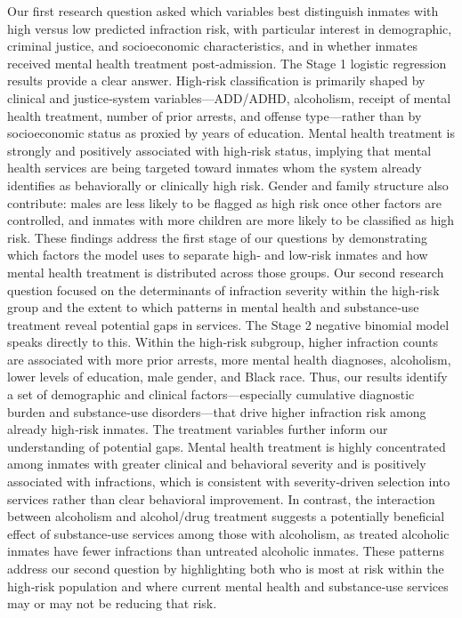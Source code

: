 \documentclass[
]{article}
\begin{document}
Our first research question asked which variables best distinguish
inmates with high versus low predicted infraction risk, with particular
interest in demographic, criminal justice, and socioeconomic
characteristics, and in whether inmates received mental health treatment
post‑admission. The Stage 1 logistic regression results provide a clear
answer. High‑risk classification is primarily shaped by clinical and
justice‑system variables---ADD/ADHD, alcoholism, receipt of mental
health treatment, number of prior arrests, and offense type---rather
than by socioeconomic status as proxied by years of education. Mental
health treatment is strongly and positively associated with high‑risk
status, implying that mental health services are being targeted toward
inmates whom the system already identifies as behaviorally or clinically
high risk. Gender and family structure also contribute: males are less
likely to be flagged as high risk once other factors are controlled, and
inmates with more children are more likely to be classified as high
risk. These findings address the first stage of our questions by
demonstrating which factors the model uses to separate high‑ and
low‑risk inmates and how mental health treatment is distributed across
those groups. Our second research question focused on the determinants
of infraction severity within the high‑risk group and the extent to
which patterns in mental health and substance‑use treatment reveal
potential gaps in services. The Stage 2 negative binomial model speaks
directly to this. Within the high‑risk subgroup, higher infraction
counts are associated with more prior arrests, more mental health
diagnoses, alcoholism, lower levels of education, male gender, and Black
race. Thus, our results identify a set of demographic and clinical
factors---especially cumulative diagnostic burden and substance‑use
disorders---that drive higher infraction risk among already high‑risk
inmates. The treatment variables further inform our understanding of
potential gaps. Mental health treatment is highly concentrated among
inmates with greater clinical and behavioral severity and is positively
associated with infractions, which is consistent with severity‑driven
selection into services rather than clear behavioral improvement. In
contrast, the interaction between alcoholism and alcohol/drug treatment
suggests a potentially beneficial effect of substance‑use services among
those with alcoholism, as treated alcoholic inmates have fewer
infractions than untreated alcoholic inmates. These patterns address our
second question by highlighting both who is most at risk within the
high‑risk population and where current mental health and substance‑use
services may or may not be reducing that risk.
\end{document}

